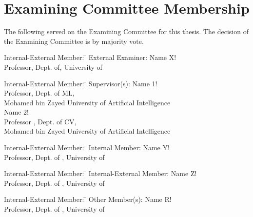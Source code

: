 \cleardoublepage %

 
\setcounter{page}{2}

\section*{Examining Committee Membership} 
  \noindent
The following served on the Examining Committee for this thesis. The decision of the Examining Committee is by majority vote.
  \bigskip
  
  \noindent
\begin{tabbing}
Internal-External Member: \=  \kill %
External Examiner: \>  Name X! \\ 
\> Professor, Dept. of, University of \\
\end{tabbing} 
  \bigskip
  
  \noindent
\begin{tabbing}
Internal-External Member: \=  \kill %
Supervisor(s): \> Name 1!\\
\> Professor, Dept. of ML, \\
\> Mohamed bin Zayed University of Artificial Intelligence  \\
\> Name 2! \\
\> Professor , Dept. of CV, \\
\> Mohamed bin Zayed University of Artificial Intelligence   \\
\end{tabbing}
  \bigskip
  
  \noindent
  \begin{tabbing}
Internal-External Member: \=  \kill %
Internal Member: \> Name Y! \\
\> Professor, Dept. of , University of  \\
\end{tabbing}
  \bigskip
  
  \noindent
\begin{tabbing}
Internal-External Member: \=  \kill %
Internal-External Member: \> Name Z! \\
\> Professor, Dept. of , University of  \\
\end{tabbing}
  \bigskip
  
  \noindent
\begin{tabbing}
Internal-External Member: \=  \kill %
Other Member(s): \> Name R! \\
\> Professor, Dept. of , University of \\
\end{tabbing}

\cleardoublepage
